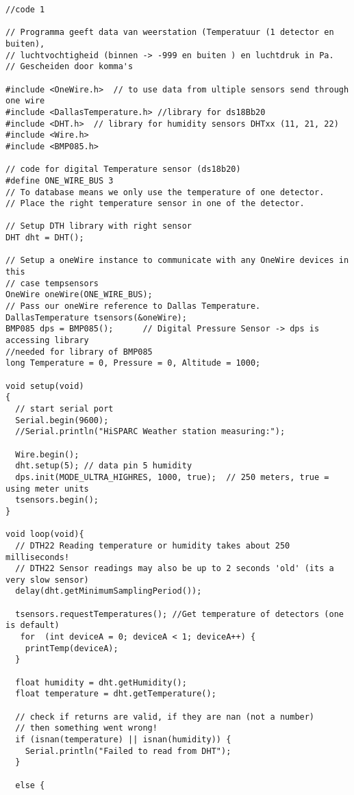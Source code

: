\begin{verbatim}
//code 1

// Programma geeft data van weerstation (Temperatuur (1 detector en buiten),
// luchtvochtigheid (binnen -> -999 en buiten ) en luchtdruk in Pa.
// Gescheiden door komma's

#include <OneWire.h>  // to use data from ultiple sensors send through one wire
#include <DallasTemperature.h> //library for ds18Bb20
#include <DHT.h>  // library for humidity sensors DHTxx (11, 21, 22)
#include <Wire.h>
#include <BMP085.h>

// code for digital Temperature sensor (ds18b20)
#define ONE_WIRE_BUS 3
// To database means we only use the temperature of one detector. 
// Place the right temperature sensor in one of the detector.

// Setup DTH library with right sensor
DHT dht = DHT();

// Setup a oneWire instance to communicate with any OneWire devices in this 
// case tempsensors
OneWire oneWire(ONE_WIRE_BUS); 
// Pass our oneWire reference to Dallas Temperature.
DallasTemperature tsensors(&oneWire);
BMP085 dps = BMP085();      // Digital Pressure Sensor -> dps is accessing library 
//needed for library of BMP085
long Temperature = 0, Pressure = 0, Altitude = 1000; 

void setup(void)
{
  // start serial port
  Serial.begin(9600);
  //Serial.println("HiSPARC Weather station measuring:");

  Wire.begin();
  dht.setup(5); // data pin 5 humidity
  dps.init(MODE_ULTRA_HIGHRES, 1000, true);  // 250 meters, true = using meter units
  tsensors.begin();
}
 
void loop(void){
  // DTH22 Reading temperature or humidity takes about 250 milliseconds!
  // DTH22 Sensor readings may also be up to 2 seconds 'old' (its a very slow sensor)
  delay(dht.getMinimumSamplingPeriod());
  
  tsensors.requestTemperatures(); //Get temperature of detectors (one is default)
   for  (int deviceA = 0; deviceA < 1; deviceA++) {
    printTemp(deviceA);
  }
  
  float humidity = dht.getHumidity();
  float temperature = dht.getTemperature();
  
  // check if returns are valid, if they are nan (not a number) 
  // then something went wrong!
  if (isnan(temperature) || isnan(humidity)) {
    Serial.println("Failed to read from DHT");
  } 
  
  else {
  

\end{verbatim}
